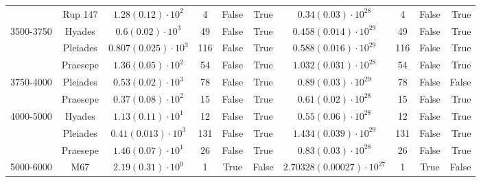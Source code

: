 \begin{tabular}{lccccccccr}
          & Rup 147 &    $1.28\left(0.12\right)\cdot 10^{2}$ &              4 &           False &            True &        $0.34\left(0.03\right)\cdot 10^{28}$ &                4 &             False &              True \\
3500-3750 & Hyades &     $0.6\left(0.02\right)\cdot 10^{3}$ &             49 &           False &            True &      $0.458\left(0.014\right)\cdot 10^{29}$ &               49 &             False &              True \\
          & Pleiades &  $0.807\left(0.025\right)\cdot 10^{3}$ &            116 &           False &            True &      $0.588\left(0.016\right)\cdot 10^{29}$ &              116 &             False &              True \\
          & Praesepe &    $1.36\left(0.05\right)\cdot 10^{2}$ &             54 &           False &            True &      $1.032\left(0.031\right)\cdot 10^{28}$ &               54 &             False &              True \\
3750-4000 & Pleiades &    $0.53\left(0.02\right)\cdot 10^{3}$ &             78 &           False &            True &        $0.89\left(0.03\right)\cdot 10^{29}$ &               78 &             False &             False \\
          & Praesepe &    $0.37\left(0.08\right)\cdot 10^{2}$ &             15 &           False &            True &        $0.61\left(0.02\right)\cdot 10^{28}$ &               15 &             False &              True \\
4000-5000 & Hyades &    $1.13\left(0.11\right)\cdot 10^{1}$ &             12 &           False &            True &        $0.55\left(0.06\right)\cdot 10^{28}$ &               12 &             False &              True \\
          & Pleiades &   $0.41\left(0.013\right)\cdot 10^{3}$ &            131 &           False &            True &      $1.434\left(0.039\right)\cdot 10^{29}$ &              131 &             False &              True \\
          & Praesepe &    $1.46\left(0.07\right)\cdot 10^{1}$ &             26 &           False &            True &        $0.83\left(0.03\right)\cdot 10^{28}$ &               26 &             False &              True \\
5000-6000 & M67 &    $2.19\left(0.31\right)\cdot 10^{0}$ &              1 &            True &           False &  $2.70328\left(0.00027\right)\cdot 10^{27}$ &                1 &              True &             False \\

\end{tabular}
